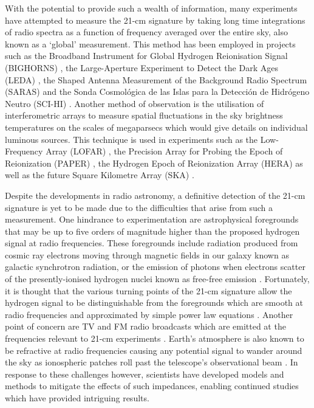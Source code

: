 With the potential to provide such a wealth of information, many experiments have attempted to measure the 21-cm signature by taking long time integrations of radio spectra as a function of frequency averaged over the entire sky, also known as a ‘global’ measurement. This method has been employed in projects such as the Broadband Instrument for Global Hydrogen Reionisation Signal (BIGHORNS) \citep{bighorns}, the Large-Aperture Experiment to Detect the Dark Ages (LEDA) \citep{leda}, the Shaped Antenna Measurement of the Background Radio Spectrum (SARAS) \citep{saras} and the Sonda Cosmol\'{o}gica de las Islas para la Detecci\'{o}n de Hidr\'{o}geno Neutro (SCI-HI) \citep{scihi}. Another method of observation is the utilisation of interferometric arrays to measure spatial fluctuations in the sky brightness temperatures on the scales of megaparsecs which would give details on individual luminous sources. This technique is used in experiments such as the Low-Frequency Array (LOFAR) \citep{lofar}, the Precision Array for Probing the Epoch of Reionization (PAPER) \citep{paper}, the Hydrogen Epoch of Reionization Array (HERA) \citep{hera} as well as the future Square Kilometre Array (SKA) \citep{ska}.

Despite the developments in radio astronomy, a definitive detection of the 21-cm signature is yet to be made due to the difficulties that arise from such a measurement. One hindrance to experimentation are astrophysical foregrounds that may be up to five orders of magnitude higher than the proposed hydrogen signal at radio frequencies. These foregrounds include radiation produced from cosmic ray electrons moving through magnetic fields in our galaxy known as galactic synchrotron radiation, or the emission of photons when electrons scatter of the presently-ionised hydrogen nuclei known as free-free emission \citep{foregrounds,edges}. Fortunately, it is thought that the various turning points of the 21-cm signature allow the hydrogen signal to be distinguishable from the foregrounds which are smooth at radio frequencies and approximated by simple power law equations \citep{edgesNature}. Another point of concern are TV and FM radio broadcasts which are emitted at the frequencies relevant to 21-cm experiments \citep{reach}. Earth’s atmosphere is also known to be refractive at radio frequencies causing any potential signal to wander around the sky as ionospheric patches roll past the telescope’s observational beam \citep{lofar}. In response to these challenges however, scientists have developed models and methods to mitigate the effects of such impedances, enabling continued studies which have provided intriguing results.



